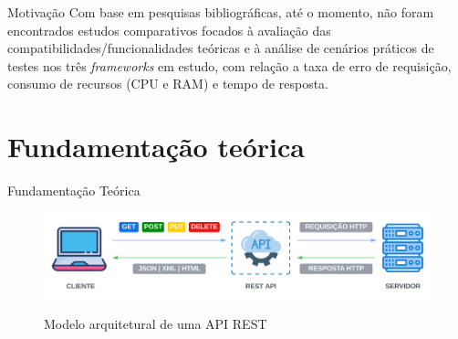\documentclass{libs/ufc_format}
\begin{document}
\begin{frame}{Motivação}
    Com base em pesquisas bibliográficas, até o momento, não foram encontrados estudos comparativos focados à avaliação das compatibilidades/funcionalidades teóricas e à análise de cenários práticos de testes nos três \textit{frameworks} em estudo, com relação a taxa de erro de requisição, consumo de recursos (CPU e RAM) e tempo de resposta.
\end{frame}

\section{Fundamentação teórica}
\begin{frame}{Fundamentação Teórica}
    \begin{figure}[H]
        \centering
        \caption{Modelo arquitetural de uma API REST}
        \includegraphics[width=1\linewidth]{figuras/modelo-rest-api.png}
        \captionsetup{justification=centering}
        \label{fig:modelo-rest-api}
    \end{figure}
\end{frame}
\end{document}
